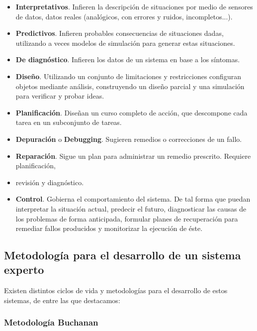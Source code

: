 \documentclass[a4paper, 11pt, titlepage]{article}
\begin{document}
        \begin{itemize}
            \item \textbf{Interpretativos}. Infieren la descripción de situaciones por medio 
            de sensores de datos, datos reales (analógicos, con errores y ruidos, incompletos...).
            \item \textbf{Predictivos}. Infieren probables consecuencias de situaciones dadas, utilizando 
            a veces modelos de simulación para generar estas situaciones.
            \item \textbf{De diagnóstico}. Infieren los datos de un sistema en base a los síntomas.
            \item \textbf{Diseño}. Utilizando un conjunto de limitaciones y restricciones configuran objetos 
            mediante análisis, construyendo un diseño parcial y una simulación para verificar y probar ideas.
            \item \textbf{Planificación}. Diseñan un curso completo de acción, que descompone cada tarea en 
            un subconjunto de tareas.
            \item \textbf{Depuración} o \textbf{Debugging}. Sugieren remedios o correcciones de un fallo. 
            \item \textbf{Reparación}. Sigue un plan para administrar un remedio prescrito. Requiere planificación,
            \item revisión y diagnóstico.
            \item \textbf{Control}. Gobierna el comportamiento del sistema. De tal forma que puedan interpretar 
            la situación actual, predecir el futuro, diagnosticar las causas de los problemas de forma anticipada, 
            formular planes de recuperación para remediar fallos producidos y monitorizar la ejecución de éste.
        \end{itemize}

    \subsection{Metodología para el desarrollo de un sistema experto}

        Existen distintos ciclos de vida y metodologías para el desarrollo de estos sistemas, de 
        entre las que destacamos:

        \subsubsection{Metodología Buchanan}
\end{document}
